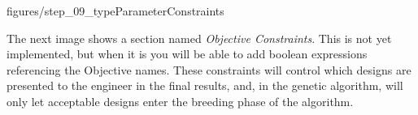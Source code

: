 \documentclass[11pt,a4paper]{../tutorial}
\begin{document}
\begin{instructions}
\begin{center}\begin{annotation}[width=0.6\linewidth,trim=0 0 0 0,clip]{figures/step_09_typeParameterConstraints}
    \end{annotation}\end{center}














\newpage

The next image shows a section named \emph{Objective Constraints}.  This is not yet implemented, but when it is you will be able to add boolean expressions referencing the Objective names.  These constraints will control which designs are presented to the engineer in the final results, and, in the genetic algorithm, will only let acceptable designs enter the breeding phase of the algorithm.


\end{instructions}
\end{document}
